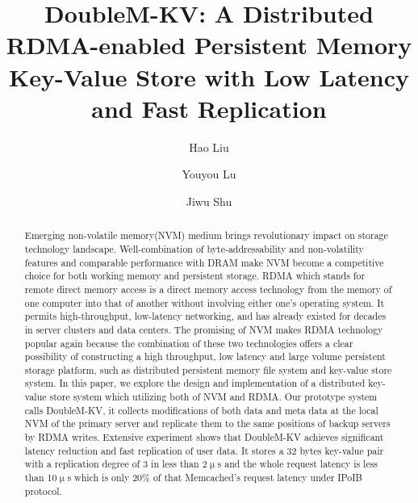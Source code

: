 \documentclass[format=acmsmall, review=false, screen=true]{acmart}
\begin{document}
\title[]{DoubleM-KV: A Distributed RDMA-enabled Persistent Memory Key-Value Store with Low Latency and Fast Replication}

\author{Hao Liu}

\author{Youyou Lu}

\author{Jiwu Shu}

\begin{abstract}

	Emerging non-volatile memory(NVM) medium brings revolutionary impact on storage technology landscape. Well-combination of byte-addressability and non-volatility features and comparable performance with DRAM make NVM become a competitive choice for both working memory and persistent storage. RDMA which stands for remote direct memory access is a direct memory access technology from the memory of one computer into that of another without involving either one's operating system. It permits high-throughput, low-latency networking, and has already existed for decades in server clusters and data centers. The promising of NVM makes RDMA technology popular again because the combination of these two technologies offers a clear possibility of constructing a high throughput, low latency and large volume persistent storage platform, such as distributed persistent memory file system and key-value store system. In this paper, we explore the design and implementation of a distributed key-value store system which utilizing both of NVM and RDMA. Our prototype system calls DoubleM-KV, it collects modifications of both data and meta data at the local NVM of the primary server and replicate them to the same positions of backup servers by RDMA writes. Extensive experiment shows that DoubleM-KV achieves significant latency	reduction and fast replication of user data. It stores a 32 bytes key-value pair with a replication degree of 3 in less than 2$\upmu$s and the whole request latency is less than 10$\upmu$s which is only 20\% of that Memcached's request latency under IPoIB protocol.

\end{abstract}
\end{document}
